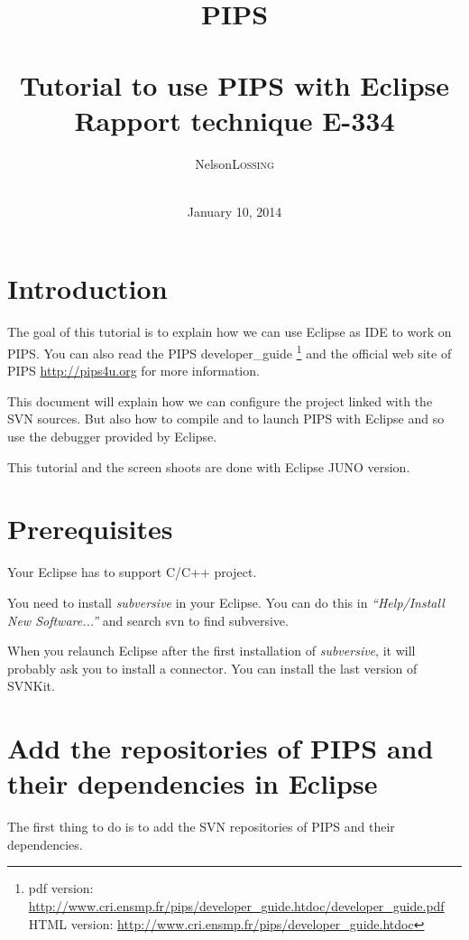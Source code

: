 \documentclass[a4paper]{article}
\title{{\Huge PIPS} \\ ~ \\ Tutorial to use PIPS with Eclipse \\ \normalsize{Rapport technique E-334}}
\author{
\begin{tabular}{rl}
  Nelson & \textsc{Lossing}
\end{tabular}\\
}
\date{January 10, 2014}
\newcommand{\LINK}[1]{\url{#1}\xspace}
\newcommand{\PipsNewWWW}{\LINK{http://pips4u.org}\xspace}
\newcommand{\PipsDevGuidePDF}{\LINK{http://www.cri.ensmp.fr/pips/developer_guide.htdoc/developer_guide.pdf}}
\newcommand{\PipsDevGuideHTDOC}{\LINK{http://www.cri.ensmp.fr/pips/developer_guide.htdoc}}
\begin{document}
\maketitle

\clearpage
\tableofcontents

\newpage

\section{Introduction}

The goal of this tutorial is to explain how we can use Eclipse as IDE to work on PIPS. 
You can also read the PIPS developer\_guide 
\footnote{pdf version: \PipsDevGuidePDF \\ HTML version: \PipsDevGuideHTDOC} and 
the official web site of PIPS \PipsNewWWW for more information.

This document will explain how we can configure the project linked with the SVN sources.
But also how to compile and to launch PIPS with Eclipse and so use the debugger provided by Eclipse.

This tutorial and the screen shoots are done with Eclipse JUNO version.



\section{Prerequisites}

Your Eclipse has to support C/C++ project.

You need to install \emph{subversive} in your Eclipse.
You can do this in \emph{``Help/Install New Software...''} and search svn to find subversive.

When you relaunch Eclipse after the first installation of \emph{subversive}, 
it will probably ask you to install a connector. You can install the last version of SVNKit.%


\section{Add the repositories of PIPS and their dependencies in Eclipse}
\label{sec:addSVNrepo}
The first thing to do is to add the SVN repositories of PIPS and their dependencies.
\end{document}
